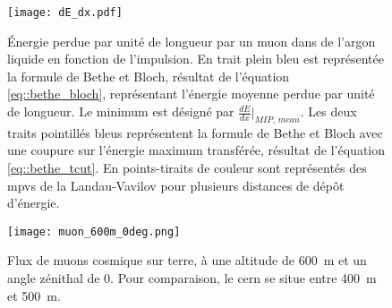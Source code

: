         \begin{figure}[!htb]
          \centering
          \texttt{[image: dE\_dx.pdf]}
          \caption[Énergie perdue par unité de longueur d'une MIP en fonction de l'impulsion]{\label{fig::bethe_landau}Énergie perdue par unité de longueur par un muon dans de l'argon liquide en fonction de l'impulsion. En trait plein bleu est représentée la formule de Bethe et Bloch, résultat de l'équation \eqref{eq::bethe_bloch}, représentant l'énergie moyenne perdue par unité de longueur. Le minimum est désigné par $\frac{dE}{dx}\rvert_{MIP,\,mean}$. Les deux traits pointillés bleus représentent la formule de Bethe et Bloch avec une coupure sur l'énergie maximum transférée, résultat de l'équation \eqref{eq::bethe_tcut}. En points-tiraits de couleur sont représentés des \glspl{mpv} de la Landau-Vavilov pour plusieurs distances de dépôt d'énergie.}
        \end{figure}

        \begin{figure}[!htb]
          \centering
          \texttt{[image: muon\_600m\_0deg.png]}
          \caption[Flux de muons cosmique sur terre]{\label{fig::muon_flux}Flux de muons cosmique sur terre, à une altitude de \SI{600}{\meter} et un angle zénithal de 0\cite{Shukla2016}. Pour comparaison, le \gls{cern} se situe entre \SI{400}{\meter} et \SI{500}{\meter}.}
        \end{figure}
        
